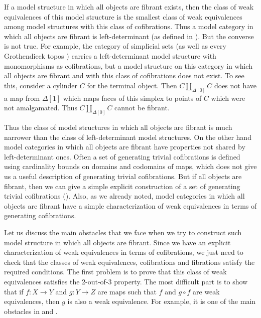 \documentclass{tac}
\theoremstyle{definition}
\begin{document}
If a model structure in which all objects are fibrant exists, then the class of weak equivalences of this model structure
is the smallest class of weak equivalences among model structures with this class of cofibrations.
Thus a model category in which all objects are fibrant is left-determinant (as defined in \cite{left-det}).
But the converse is not true.
For example, the category of simplicial sets (as well as every Grothendieck topos \cite{cisinski})
carries a left-determinant model structure with monomorphisms as cofibrations,
but a model structure on this category in which all objects are fibrant and with this class of cofibrations does not exist.
To see this, consider a cylinder $C$ for the terminal object.
Then $C \amalg_{\Delta[0]} C$ does not have a map from $\Delta[1]$ which
maps faces of this simplex to points of $C$ which were not amalgamated.
Thus $C \amalg_{\Delta[0]} C$ cannot be fibrant.

Thus the class of model structures in which all objects are fibrant is much narrower than the class of left-determinant model structures.
On the other hand model categories in which all objects are fibrant have properties not shared by left-determinant ones.
Often a set of generating trivial cofibrations is defined using cardinality bounds on domains and codomains of maps,
which does not give us a useful description of generating trivial cofibrations.
But if all objects are fibrant, then we can give a simple explicit construction of a set of generating trivial cofibrations ().
Also, as we already noted, model categories in which all objects are fibrant have a simple characterization of weak equivalences in terms of generating cofibrations.

Let us discuss the main obstacles that we face when we try to construct such model structure in which all objects are fibrant.
Since we have an explicit characterization of weak equivalences in terms of cofibrations,
we just need to check that the classes of weak equivalences, cofibrations and fibrations satisfy the required conditions.
The first problem is to prove that this class of weak equivalences satisfies the 2-out-of-3 property.
The most difficult part is to show that if $f : X \to Y$ and $g : Y \to Z$ are maps such that $f$ and $g \circ f$ are weak equivalences, then $g$ is also a weak equivalence.
For example, it is one of the main obstacles in \cite{folk} and \cite{alg-models}.
\end{document}
